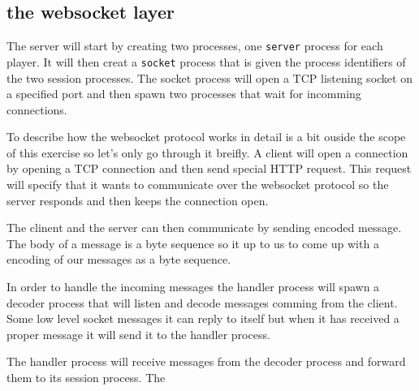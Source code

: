 \documentclass[a4paper,11pt]{article}
\begin{document}
\subsection*{the websocket layer}

The server will start by creating two processes, one {\tt server}
process for each player. It will then creat a {\tt socket} process
that is given the process identifiers of the two session
processes. The socket process will open a TCP listening socket on a
specified port and then spawn two processes that wait for incomming
connections.

To describe how the websocket protocol works in detail is a bit ouside
the scope of this exercise so let's only go through it breifly. A
client will open a connection by opening a TCP connection and then
send special HTTP request. This request will specify that it wants to
communicate over the websocket protocol so the server responds and
then keeps the connection open.

The clinent and the server can then communicate by sending encoded
message. The body of a message is a byte sequence so it up to us to
come up with a encoding of our messages as a byte sequence.

In order to handle the incoming messages the handler process will
spawn a decoder process that will listen and decode messages comming
from the client. Some low level socket messages it can reply to itself
but when it has received a proper message it will send it to the
handler process.

The handler process will receive messages from the decoder process and
forward them to its session process. The 
\end{document}
